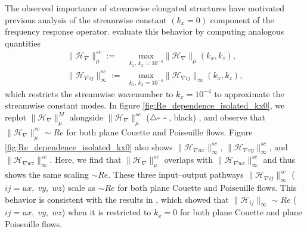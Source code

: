 The observed importance  of streamwise elongated structures have motivated previous analysis of the streamwise constant $(k_x=0)$ component of the frequency response operator.  evaluate this behavior by computing analogous quantities 
\begin{subequations}
\begin{align}
    \|\mathcal{H}_{\nabla }\|_{\mu}^{sc}:=&\underset{k_z,\,k_x=10^{-4}}{\text{max}}\|\mathcal{H}_{\nabla }\|_{\mu}(k_x,k_z), \\
    \|\mathcal{H}_{\nabla ij}\|_{\infty}^{sc}:=&\underset{k_z,\,k_x=10^{-4}}{\text{max}}\|\mathcal{H}_{\nabla ij}\|_{\infty}(k_x,k_z), 
    \label{eq:H_nabla_ij_M_sc}
\end{align}
\end{subequations}
which restricts the streamwise wavenumber to $k_x=10^{-4}$ to approximate the streamwise constant modes. In figure \ref{fig:Re_dependence_isolated_kx0}, we replot $\|\mathcal{H}_{\nabla }\|_{\mu}^{M}$ alongside $\|\mathcal{H}_{\nabla }\|_{\mu}^{sc}$ ($\triangle\dashed$, black) , and observe that $\|\mathcal{H}_{\nabla }\|_{\mu}^{sc}\sim Re$ for both plane Couette and Poiseuille flows. Figure \ref{fig:Re_dependence_isolated_kx0} also shows  $\|\mathcal{H}_{\nabla ux}\|_{\infty}^{sc}$, $\|\mathcal{H}_{\nabla vy}\|_{\infty}^{sc}$, and $\|\mathcal{H}_{\nabla wz}\|_{\infty}^{sc}$. Here, we find that $\|\mathcal{H}_{\nabla }\|_{\mu}^{sc}$ overlaps with $\|\mathcal{H}_{\nabla ux}\|_{\infty}^{sc}$ and thus shows the same scaling $\sim Re$. These three input--output pathways $\|\mathcal{H}_{\nabla ij}\|_{\infty}^{sc}$ ($ij=ux,\;vy,\;wz$) scale as $\sim Re$ for both plane Couette and Poiseuille flows. This behavior is consistent with the results in \citet[theorem 11]{jovanovic2004modeling}, which showed that $\|\mathcal{H}_{ij}\|_{\infty}\sim Re$ ($ij=ux,\;vy,\;wz$) when it is restricted to $k_x=0$ for both plane Couette and plane Poiseuille flows.  
